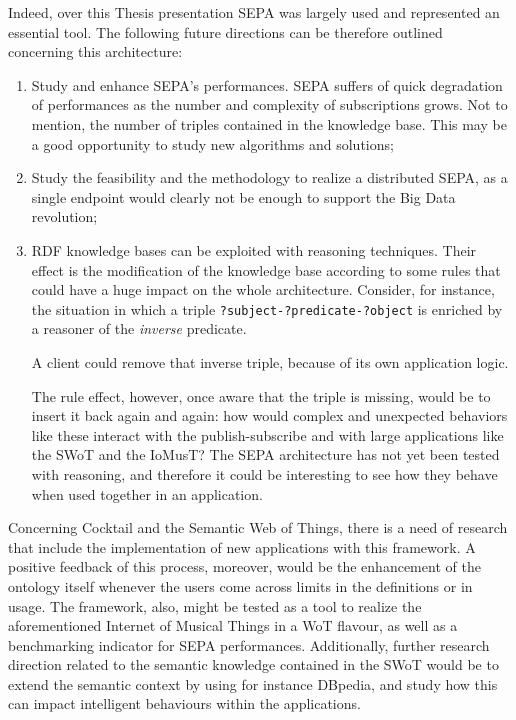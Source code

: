 Indeed, over this Thesis presentation SEPA was largely used and represented an essential tool. The following future directions can be therefore outlined concerning this architecture:
\begin{enumerate}
    \item Study and enhance SEPA's performances. SEPA suffers of quick degradation of performances as the number and complexity of subscriptions grows. Not to mention, the number of triples contained in the knowledge base. This may be a good opportunity to study new algorithms and solutions;
    \item Study the feasibility and the methodology to realize a distributed SEPA, as a single endpoint would clearly not be enough to support the Big Data revolution;
    \item RDF knowledge bases can be exploited with reasoning techniques. Their effect is the modification of the knowledge base according to some rules that could have a huge impact on the whole architecture. Consider, for instance, the situation in which a triple \texttt{?subject-?predicate-?object} is enriched by a reasoner of the \textit{inverse} predicate.
    
A client could remove that inverse triple, because of its own application logic.

The rule effect, however, once aware that the triple is missing, would be to insert it back again and again: how would complex and unexpected behaviors like these interact with the publish-subscribe and with large applications like the SWoT and the IoMusT? The SEPA architecture has not yet been tested with reasoning, and therefore it could be interesting to see how they behave when used together in an application.
\end{enumerate}

Concerning Cocktail and the Semantic Web of Things, there is a need of research that include the implementation of new applications with this framework. A positive feedback of this process, moreover, would be the enhancement of the ontology itself whenever the users come across limits in the definitions or in usage. The framework, also, might be tested as a tool to realize the aforementioned Internet of Musical Things in a WoT flavour, as well as a benchmarking indicator for SEPA performances. Additionally, further research direction related to the semantic knowledge contained in the SWoT would be to extend the semantic context by using for instance DBpedia, and study how this can impact intelligent behaviours within the applications.


